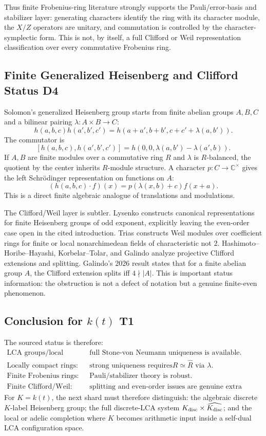 Thus finite Frobenius-ring literature strongly supports the Pauli/error-basis
and stabilizer layer: generating characters identify the ring with its
character module, the \(X/Z\) operators are unitary, and commutation is
controlled by the character-symplectic form.  This is not, by itself, a full
Clifford or Weil representation classification over every commutative
Frobenius ring.

\subsection{Finite Generalized Heisenberg and Clifford Status D4}

Solomon's generalized Heisenberg group starts from finite abelian groups
\(A,B,C\) and a bilinear pairing \(\lambda:A\times B\to C\):
\[
  h(a,b,c)h(a',b',c')
  =
  h(a+a',b+b',c+c'+\lambda(a,b')).
\]
The commutator is
\[
  [h(a,b,c),h(a',b',c')]
  =
  h(0,0,\lambda(a,b')-\lambda(a',b)).
\]
If \(A,B\) are finite modules over a commutative ring \(R\) and \(\lambda\)
is \(R\)-balanced, the quotient by the center inherits \(R\)-module
structure.  A character \(p:C\to\mathbb C^\times\) gives the left
Schrödinger representation on functions on \(A\):
\[
  (h(a,b,c)\cdot f)(x)=p(\lambda(x,b)+c)f(x+a).
\]
This is a direct finite algebraic analogue of translations and modulations.

The Clifford/Weil layer is subtler.  Lysenko constructs canonical
representations for finite Heisenberg groups of odd exponent, explicitly
leaving the even-order case open in the cited introduction.  Trias constructs
Weil modules over coefficient rings for finite or local nonarchimedean fields
of characteristic not \(2\).  Hashimoto--Horibe--Hayashi, Korbelar--Tolar,
and Galindo analyze projective Clifford extensions and splitting.  Galindo's
2026 result states that for a finite abelian group \(A\), the Clifford
extension splits iff \(4\nmid |A|\).  This is important status information:
the obstruction is not a defect of notation but a genuine finite-even
phenomenon.

\subsection{Conclusion for \texorpdfstring{\(k(t)\)}{k(t)} T1}

The sourced status is therefore:
\[
\begin{array}{ll}
\text{LCA groups/local fields:} & \text{full Stone-von Neumann uniqueness is
available.}\\
\text{Locally compact rings:} & \text{strong uniqueness requires
}R\simeq\widehat R\text{ via }\lambda.\\
\text{Finite Frobenius rings:} & \text{Pauli/stabilizer theory is robust.}\\
\text{Finite Clifford/Weil:} & \text{splitting and even-order issues are
genuine extra data.}
\end{array}
\]
For \(K=k(t)\), the next shard must therefore distinguish: the algebraic
discrete \(K\)-label Heisenberg group; the full discrete-LCA system
\(K_{\rm disc}\times\widehat{K_{\rm disc}}\); and the local or adelic
completion where \(K\) becomes arithmetic input inside a self-dual LCA
configuration space.
